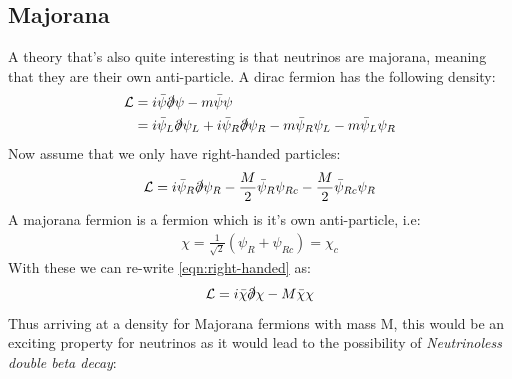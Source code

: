 \documentclass[11pt,a4paper,faculty=we,language=en,doctype=report]{cls/ugent-doc}
\begin{document}
\subsection{Majorana}
A theory that's also quite interesting is that
neutrinos are majorana, meaning that they are their own anti-particle.
A dirac fermion has the following density:
\begin{align}
  \mathcal{L} &= i\bar{\psi}\slashed{\partial}\psi - m\bar{\psi}\psi\\
              &= i\bar{\psi}_L\slashed{\partial}\psi_L + i\bar{\psi}_R\slashed{\partial}\psi_R - m\bar{\psi}_R\psi_L - m\bar{\psi}_L\psi_R
\end{align}
Now assume that we only have right-handed particles:
\begin{equation}
  \mathcal{L} = i\bar{\psi}_R\slashed{\partial}\psi_R - \frac{M}{2}\bar{\psi}_R\psi_{Rc} - \frac{M}{2}\bar{\psi}_{Rc}\psi_R
\label{eqn:right-handed}
\end{equation}
A majorana fermion is a fermion which is it's own anti-particle, i.e:
\begin{align}
  \chi = \frac{1}{\sqrt{2}}\left( \psi_R + \psi_{Rc}  \right) = \chi_c
\end{align}
With these we can re-write \ref{eqn:right-handed} as:
\begin{equation}
  \mathcal{L} = i\bar{\chi}\slashed{\partial}\chi - M \bar{\chi}\chi
\end{equation}
Thus arriving at a density for Majorana fermions with mass M, this would be an exciting property
for neutrinos as it would lead to the possibility of
\textit{Neutrinoless double beta decay}:
\end{document}
